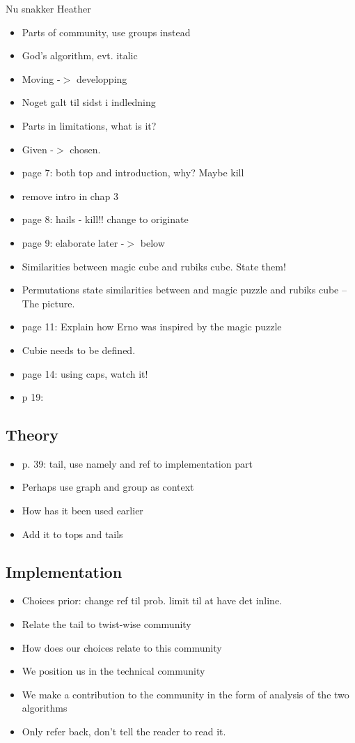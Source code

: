 Nu snakker Heather
\begin{itemize}
	\item Parts of community, use groups instead
	\item God's algorithm, evt. italic
	\item Moving -$>$ developping
	\item Noget galt til sidst i indledning
	\item Parts in limitations, what is it?
	\item Given -$>$ chosen.
	\item page 7: both top and introduction, why? Maybe kill
	\item remove intro in chap 3
	\item page 8: hails - kill!! change to originate
	\item page 9: elaborate later -$>$ below
	\item Similarities between magic cube and rubiks cube. State them!
	\item Permutations state similarities between and magic puzzle and rubiks cube -- The picture.
	\item page 11: Explain how Erno was inspired by the magic puzzle
	\item Cubie needs to be defined.
	\item page 14: using caps, watch it!
	\item p 19: 
\end{itemize}

\subsection{Theory}
\begin{itemize}
	\item p. 39: tail, use namely and ref to implementation part
	\item Perhaps use graph and group as context
	\item How has it been used earlier
	\item Add it to tops and tails
\end{itemize}

\subsection{Implementation}
\begin{itemize}
	\item Choices prior: change ref til prob. limit til at have det inline.
	\item Relate the tail to twist-wise community
	\item How does our choices relate to this community
	\item We position us in the technical community
	\item We make a contribution to the community in the form of analysis of the two algorithms
	\item Only refer back, don't tell the reader to read it.
\end{itemize}

